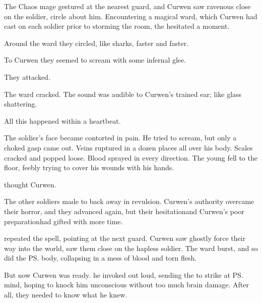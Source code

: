 The Chaos mage gestured at the nearest guard, and Curwen saw ravenous \daemons{} close on the soldier, circle about him. Encountering a magical ward, which Curwen had cast on each soldier prior to storming the room, the \daemons{} hesitated a moment. 

Around the ward they circled, like sharks, faster and faster. 

To Curwen they seemed to scream with some infernal glee. 

They attacked. 

The ward cracked. 
The sound was audible to Curwen's trained ear; like glass shattering. 

All this happened within a heartbeat. 

The soldier's face became contorted in pain. 
He tried to scream, but only a choked gasp came out. 
Veins ruptured in a dozen places all over his body. 
Scales cracked and popped loose. 
Blood sprayed in every direction. 
The young \dax{} fell to the floor, feebly trying to cover his wounds with his hands. 

 thought Curwen. 

The other soldiers made to back away in revulsion. 
Curwen's authority overcame their horror, and they advanced again, but their hesitation\dash and Curwen's poor preparation\dash had gifted \Onatol{} with more time. 

 \Onatol{} repeated the spell, pointing at the next guard. 
Curwen saw ghostly \daemons{} force their way into the world, saw them close on the hapless soldier. 
The ward burst, and so did the \ps{\sphyle} body, collapsing in a mess of blood and torn flesh. 

But now Curwen was ready. 
 he invoked out loud, sending the \Qliphah{} to strike at \ps{\Onatol}{} mind, hoping to knock him unconscious without too much brain damage. 
After all, they needed to know what he knew. 


